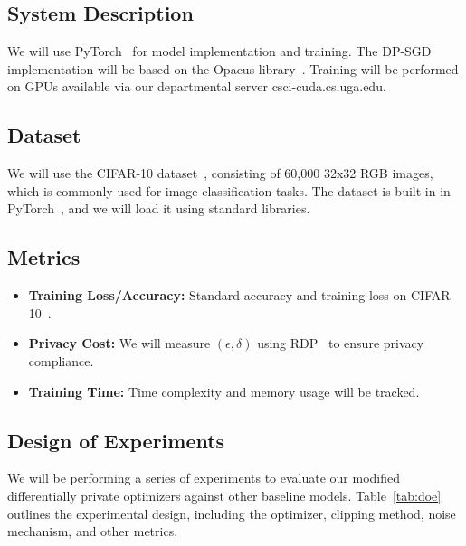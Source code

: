 \subsection{System Description}\label{subsec:system-description}
We will use PyTorch~\cite{pytorch_2019} for model implementation and training.
The DP-SGD~\cite{Abadi_2016_DeepLearningDifferentialPrivacy} implementation will be based on the Opacus library~\cite{opacus}.
Training will be performed on GPUs available via our departmental server csci-cuda.cs.uga.edu.

\subsection{Dataset}\label{subsec:dataset}
We will use the CIFAR-10 dataset~\cite{cifar10_dataset}, consisting of 60,000 32x32 RGB images, which is commonly used for
image classification tasks.
The dataset is built-in in PyTorch~\cite{pytorch_2019}, and we will load it using standard libraries.

\subsection{Metrics}\label{subsec:metrics}
\begin{itemize}
    \item \textbf{Training Loss/Accuracy:} Standard accuracy and training loss on CIFAR-10~\cite{cifar10_dataset}.
    \item \textbf{Privacy Cost:} We will measure $(\epsilon, \delta)$ using RDP~\cite{Mironov_2017_RenyiDP} to ensure privacy compliance.
    \item \textbf{Training Time:} Time complexity and memory usage will be tracked.
\end{itemize}

\subsection{Design of Experiments}\label{subsec:design-of-experiments}
We will be performing a series of experiments to evaluate our modified differentially private optimizers against other baseline models.
Table~\ref{tab:doe} outlines the experimental design, including the optimizer, clipping method, noise mechanism, and other metrics.


